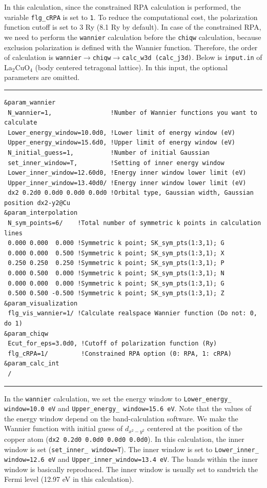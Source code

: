 \documentclass{article}
\begin{document}
In this calculation, since the constrained RPA calculation is performed, the variable {\tt flg\_cRPA} is set to {\tt 1}. To reduce the computational cost, the polarization function cutoff is set to 3 Ry (8.1 Ry by default). In case of the constrained RPA, we need to perform the {\tt wannier} calculation before the {\tt chiqw} calculation, because exclusion polarization is defined with the Wannier function. Therefore, the order of calculation is {\tt wannier}$\to${\tt chiqw}$\to${\tt calc\_w3d (calc\_j3d)}. Below is {\tt input.in} of La$_2$CuO$_4$ (body centered tetragonal lattice). In this input, the optional parameters are omitted. 
\vspace{3mm}\hrule
\begin{verbatim}
&param_wannier 
 N_wannier=1,                !Number of Wannier functions you want to calculate
 Lower_energy_window=10.0d0, !Lower limit of energy window (eV)
 Upper_energy_window=15.6d0, !Upper limit of energy window (eV)
 N_initial_guess=1,          !Number of initial Gaussian
 set_inner_window=T,         !Setting of inner energy window
 Lower_inner_window=12.60d0, !Energy inner window lower limit (eV)
 Upper_inner_window=13.40d0/ !Energy inner window lower limit (eV)
 dx2 0.2d0 0.0d0 0.0d0 0.0d0 !Orbital type, Gaussian width, Gaussian position dx2-y2@Cu
&param_interpolation   
 N_sym_points=6/    !Total number of symmetric k points in calculation lines
 0.000 0.000  0.000 !Symmetric k point; SK_sym_pts(1:3,1); G
 0.000 0.000  0.500 !Symmetric k point; SK_sym_pts(1:3,1); X
 0.250 0.250  0.250 !Symmetric k point; SK_sym_pts(1:3,1); P
 0.000 0.500  0.000 !Symmetric k point; SK_sym_pts(1:3,1); N
 0.000 0.000  0.000 !Symmetric k point; SK_sym_pts(1:3,1); G
 0.500 0.500 -0.500 !Symmetric k point; SK_sym_pts(1:3,1); Z
&param_visualization
 flg_vis_wannier=1/ !Calculate realspace Wannier function (Do not: 0, do 1)   
&param_chiqw 
 Ecut_for_eps=3.0d0, !Cutoff of polarization function (Ry)
 flg_cRPA=1/         !Constrained RPA option (0: RPA, 1: cRPA)
&param_calc_int 
 /
\end{verbatim}
\hrule\vspace{3mm}
In the \verb+wannier+ calculation, we set the energy window to \verb+Lower_energy_ window=10.0 eV+ and \verb+Upper_energy_ window=15.6 eV+. Note that the values of the energy window depend on the band-calculation software. We make the Wannier function with initial guess of $d_{x^2-y^2}$ centered at the position of the copper atom (\verb+dx2 0.2d0 0.0d0 0.0d0 0.0d0+). In this calculation, the inner window is set (\verb+set_inner_ window=T+). The inner window is set to \verb+Lower_inner_ window=12.6 eV+ and \verb+Upper_inner_window=13.4 eV+. The bands within the inner window is basically reproduced. The inner window is usually set to sandwich the Fermi level (12.97 eV in this calculation).
\end{document}
